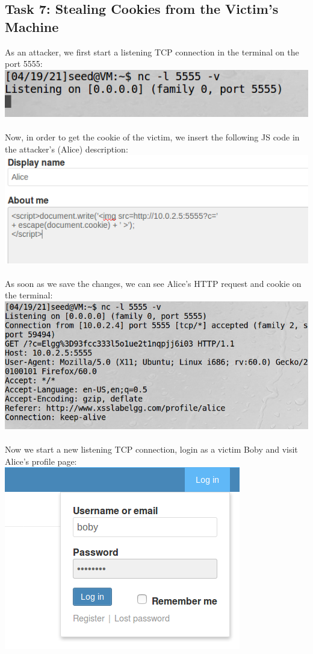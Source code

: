 \documentclass[a4paper]{article}
\begin{document}
\subsection{Task 7: Stealing Cookies from the Victim’s Machine}
As an attacker, we first start a listening TCP connection in the terminal on the port 5555:\\
\includegraphics[scale=0.7]{2/5.png}\\\\
Now, in order to get the cookie of the victim, we insert the following JS code in the attacker's (Alice) description:\\
\includegraphics[scale=0.7]{2/6.png}\\\\
As soon as we save the changes, we can see Alice's HTTP request and cookie on the terminal:\\
\includegraphics[scale=0.7]{2/7.png}\\\\
Now we start a new listening TCP connection, login as a victim Boby and visit Alice's profile page:\\
\includegraphics[scale=0.7]{2/8.png}\\\\
\end{document}
